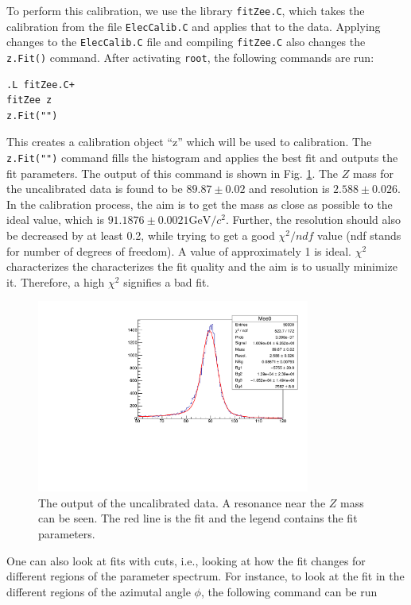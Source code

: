 \documentclass[a4paper]{report}
\numberwithin{equation}{section}
\begin{document}
To perform this calibration, we use the library \texttt{fitZee.C}, which takes the calibration from the file \texttt{ElecCalib.C} and applies that to the data. Applying changes to the \texttt{ElecCalib.C} file and compiling \texttt{fitZee.C} also changes the \texttt{z.Fit()} command. After activating \texttt{root}, the following commands are run:

\begin{verbatim}
.L fitZee.C+
fitZee z
z.Fit("")
\end{verbatim}
This creates a calibration object ``z'' which will be used to calibration. The \texttt{z.Fit("")} command fills the histogram and applies the best fit and outputs the fit parameters. The output of this command is shown in Fig. \ref{fig:uncalib}. The $Z$ mass for the uncalibrated data is found to be $89.87 \pm 0.02$ and resolution is $2.588 \pm 0.026$. In the calibration process, the aim is to get the mass as close as possible to the ideal value, which is $91.1876 \pm 0.0021 \text{GeV}/c^2$. Further, the resolution should also be decreased by at least 0.2, while trying to get a good $\chi^2 / ndf$ value (ndf stands for number of degrees of freedom). A value of approximately 1 is ideal. $\chi^2$ characterizes the characterizes the fit quality and the aim is to usually minimize it. Therefore, a high $\chi^2$ signifies a bad fit. 

\begin{figure}[htpb]
    \centering
    \includegraphics[width=0.8\textwidth]{uncalib}
    \caption{The output of the uncalibrated data. A resonance near the $Z$ mass can be seen. The red line is the fit and the legend contains the fit parameters.}
    \label{fig:uncalib}
\end{figure}

One can also look at fits with cuts, i.e., looking at how the fit changes for different regions of the parameter spectrum. For instance, to look at the fit in the different regions of the azimutal angle $\phi$, the following command can be run
\end{document}
